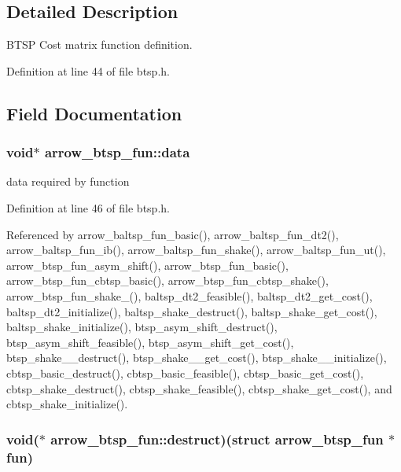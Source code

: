 \subsection{Detailed Description}
BTSP Cost matrix function definition. 

Definition at line 44 of file btsp.h.

\subsection{Field Documentation}
\hypertarget{structarrow__btsp__fun_9c1a276685fb0cac372faef2dd2ba99a}{
\subsubsection[{data}]{\setlength{\rightskip}{0pt plus 5cm}void$\ast$ {\bf arrow\_\-btsp\_\-fun::data}}}
\label{structarrow__btsp__fun_9c1a276685fb0cac372faef2dd2ba99a}


data required by function 

Definition at line 46 of file btsp.h.

Referenced by arrow\_\-baltsp\_\-fun\_\-basic(), arrow\_\-baltsp\_\-fun\_\-dt2(), arrow\_\-baltsp\_\-fun\_\-ib(), arrow\_\-baltsp\_\-fun\_\-shake(), arrow\_\-baltsp\_\-fun\_\-ut(), arrow\_\-btsp\_\-fun\_\-asym\_\-shift(), arrow\_\-btsp\_\-fun\_\-basic(), arrow\_\-btsp\_\-fun\_\-cbtsp\_\-basic(), arrow\_\-btsp\_\-fun\_\-cbtsp\_\-shake(), arrow\_\-btsp\_\-fun\_\-shake\_(), baltsp\_\-dt2\_\-feasible(), baltsp\_\-dt2\_\-get\_\-cost(), baltsp\_\-dt2\_\-initialize(), baltsp\_\-shake\_\-destruct(), baltsp\_\-shake\_\-get\_\-cost(), baltsp\_\-shake\_\-initialize(), btsp\_\-asym\_\-shift\_\-destruct(), btsp\_\-asym\_\-shift\_\-feasible(), btsp\_\-asym\_\-shift\_\-get\_\-cost(), btsp\_\-shake\_\_\-destruct(), btsp\_\-shake\_\_\-get\_\-cost(), btsp\_\-shake\_\_\-initialize(), cbtsp\_\-basic\_\-destruct(), cbtsp\_\-basic\_\-feasible(), cbtsp\_\-basic\_\-get\_\-cost(), cbtsp\_\-shake\_\-destruct(), cbtsp\_\-shake\_\-feasible(), cbtsp\_\-shake\_\-get\_\-cost(), and cbtsp\_\-shake\_\-initialize().\hypertarget{structarrow__btsp__fun_6c66b7591252728aaa441139c623446a}{
\subsubsection[{destruct}]{\setlength{\rightskip}{0pt plus 5cm}void($\ast$ {\bf arrow\_\-btsp\_\-fun::destruct})(struct {\bf arrow\_\-btsp\_\-fun} $\ast$fun)}}
\label{structarrow__btsp__fun_6c66b7591252728aaa441139c623446a}


